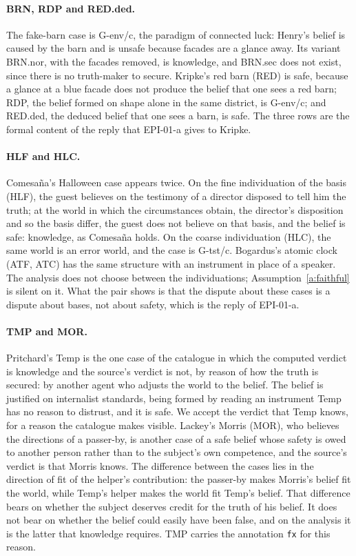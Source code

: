 \documentclass{situationist-preprint}
\begin{document}
\paragraph{BRN, RDP and RED.ded.} The fake-barn case is G-env/c, the paradigm of connected luck: Henry's belief is caused by the barn and is unsafe because facades are a glance away. Its variant BRN.nor, with the facades removed, is knowledge, and BRN.sec does not exist, since there is no truth-maker to secure. Kripke's red barn (RED) is safe, because a glance at a blue facade does not produce the belief that one sees a red barn; RDP, the belief formed on shape alone in the same district, is G-env/c; and RED.ded, the deduced belief that one sees a barn, is safe. The three rows are the formal content of the reply that EPI-01-a gives to Kripke.

\paragraph{HLF and HLC.} Comesa\~na's Halloween case appears twice. On the fine individuation of the basis (HLF), the guest believes on the testimony of a director disposed to tell him the truth; at the world in which the circumstances obtain, the director's disposition and so the basis differ, the guest does not believe on that basis, and the belief is safe: knowledge, as Comesa\~na holds. On the coarse individuation (HLC), the same world is an error world, and the case is G-tst/c. Bogardus's atomic clock (ATF, ATC) has the same structure with an instrument in place of a speaker. The analysis does not choose between the individuations; Assumption~\ref{a:faithful} is silent on it. What the pair shows is that the dispute about these cases is a dispute about bases, not about safety, which is the reply of EPI-01-a.

\paragraph{TMP and MOR.} Pritchard's Temp is the one case of the catalogue in which the computed verdict is knowledge and the source's verdict is not, by reason of how the truth is secured: by another agent who adjusts the world to the belief. The belief is justified on internalist standards, being formed by reading an instrument Temp has no reason to distrust, and it is safe. We accept the verdict that Temp knows, for a reason the catalogue makes visible. Lackey's Morris (MOR), who believes the directions of a passer-by, is another case of a safe belief whose safety is owed to another person rather than to the subject's own competence, and the source's verdict is that Morris knows. The difference between the cases lies in the direction of fit of the helper's contribution: the passer-by makes Morris's belief fit the world, while Temp's helper makes the world fit Temp's belief. That difference bears on whether the subject deserves credit for the truth of his belief. It does not bear on whether the belief could easily have been false, and on the analysis it is the latter that knowledge requires. TMP carries the annotation \texttt{fx} for this reason.
\end{document}
